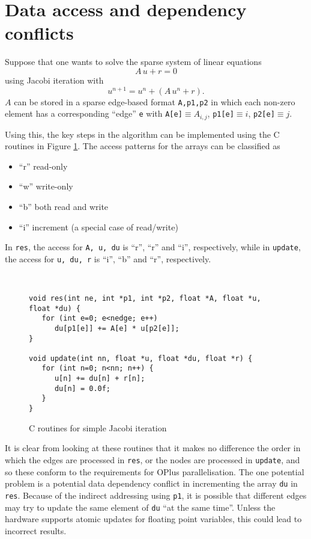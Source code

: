 \documentclass[12pt]{article}
\begin{document}
\newpage

\section{Data access and dependency conflicts}

Suppose that one wants to solve the sparse system of linear equations
\[
A\, u + r = 0
\]
using Jacobi iteration with
\[
u^{n+1} = u^n + \left( A\, u^n + r\right).
\]
$A$ can be stored in a sparse edge-based format 
\verb!A,p1,p2! in which each non-zero element has a corresponding ``edge'' 
\verb!e! with
\verb!A[e]!$\equiv A_{i,j}$, 
\verb!p1[e]!$\equiv i$, 
\verb!p2[e]!$\equiv j$. 

Using this, the key steps in the algorithm can be implemented using the C
routines in Figure \ref{fig1}.  The access patterns for the arrays can be 
classified as
\begin{itemize}
\item ``r''  read-only
\item ``w''  write-only
\item ``b''  both read and write
\item ``i''  increment  (a special case of read/write)
\end{itemize}
In \verb!res!, the access for \verb!A, u, du! is ``r'', ``r'' and ``i'', 
respectively, while
in \verb!update!, the access for \verb!u, du, r! is ``i'', ``b'' and ``r'', 
respectively.


\begin{figure}[b!]
\begin{verbatim}


void res(int ne, int *p1, int *p2, float *A, float *u, float *du) {
   for (int e=0; e<nedge; e++)
      du[p1[e]] += A[e] * u[p2[e]];
}

void update(int nn, float *u, float *du, float *r) {
   for (int n=0; n<nn; n++) {
      u[n] += du[n] + r[n];
      du[n] = 0.0f;
   }
}
\end{verbatim}
\caption{C routines for simple Jacobi iteration}
\label{fig1}
\end{figure}


It is clear from looking at these routines that it makes no difference the 
order in which the edges are processed in \verb!res!, or the nodes are processed
in \verb!update!, and so these conform to the requirements for OPlus 
parallelisation.  The one potential problem is a potential data dependency
conflict in incrementing the array \verb!du! in \verb!res!.  Because of the
indirect addressing using \verb!p1!, it is possible that different edges may 
try to update the same element of \verb!du! ``at the same time''.  Unless the 
hardware supports atomic updates for floating point variables, this could lead
to incorrect results.
\end{document}
